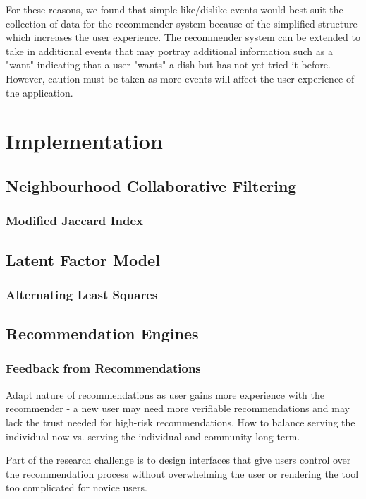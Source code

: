 For these reasons, we found that simple like/dislike events would best suit the collection of data for the recommender system because of the simplified structure which increases the user experience. The recommender system can be extended to take in additional events that may portray additional information such as a "want" indicating that a user "wants" a dish but has not yet tried it before. However, caution must be taken as more events will affect the user experience of the application. 

\section{Implementation}

\subsection{Neighbourhood Collaborative Filtering}
\subsubsection{Modified Jaccard Index}


\subsection{Latent Factor Model}
\subsubsection{Alternating Least Squares}

\subsection{Recommendation Engines}


\subsubsection{Feedback from Recommendations}

\cite{martin2009recsys}
Adapt nature of recommendations as user gains more experience with the recommender - a new user may need more verifiable recommendations and may lack the trust needed for high-risk recommendations. 
How to balance serving the individual now vs. serving the individual and community long-term. 

Part of the research challenge is to design interfaces that give users control over the recommendation process without overwhelming the user or rendering the tool too complicated for novice users. 




